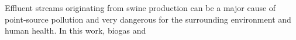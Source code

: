 Effluent streams originating from swine production can be a major cause of point-source pollution and very dangerous for the surrounding environment and human health. In this work, biogas and 